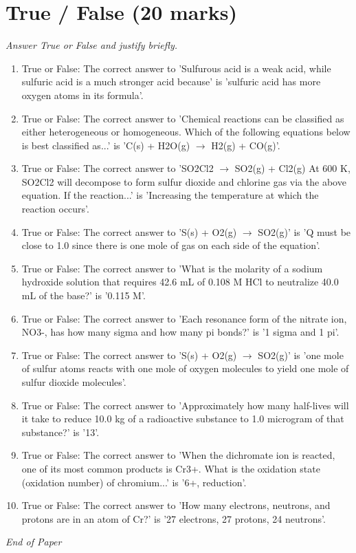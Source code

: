 \documentclass[12pt]{article}
\begin{document}
\section*{True / False (20 marks)}
\textit{Answer True or False and justify briefly.}
\begin{enumerate}[label=\arabic*.]
\item True or False: The correct answer to 'Sulfurous acid is a weak acid, while sulfuric acid is a much stronger acid because' is 'sulfuric acid has more oxygen atoms in its formula'.
\item True or False: The correct answer to 'Chemical reactions can be classified as either heterogeneous or homogeneous. Which of the following equations below is best classified as...' is 'C(s) + H2O(g) $\rightarrow$ H2(g) + CO(g)'.
\item True or False: The correct answer to 'SO2Cl2 $\rightarrow$ SO2(g) + Cl2(g) At 600 K, SO2Cl2 will decompose to form sulfur dioxide and chlorine gas via the above equation. If the reaction...' is 'Increasing the temperature at which the reaction occurs'.
\item True or False: The correct answer to 'S(s) + O2(g) $\rightarrow$ SO2(g)' is 'Q must be close to 1.0 since there is one mole of gas on each side of the equation'.
\item True or False: The correct answer to 'What is the molarity of a sodium hydroxide solution that requires 42.6 mL of 0.108 M HCl to neutralize 40.0 mL of the base?' is '0.115 M'.
\item True or False: The correct answer to 'Each resonance form of the nitrate ion, NO3-, has how many sigma and how many pi bonds?' is '1 sigma and 1 pi'.
\item True or False: The correct answer to 'S(s) + O2(g) $\rightarrow$ SO2(g)' is 'one mole of sulfur atoms reacts with one mole of oxygen molecules to yield one mole of sulfur dioxide molecules'.
\item True or False: The correct answer to 'Approximately how many half-lives will it take to reduce 10.0 kg of a radioactive substance to 1.0 microgram of that substance?' is '13'.
\item True or False: The correct answer to 'When the dichromate ion is reacted, one of its most common products is Cr3+. What is the oxidation state (oxidation number) of chromium...' is '6+, reduction'.
\item True or False: The correct answer to 'How many electrons, neutrons, and protons are in an atom of Cr?' is '27 electrons, 27 protons, 24 neutrons'.
\end{enumerate}

\vfill
\noindent\textit{End of Paper}
\end{document}
